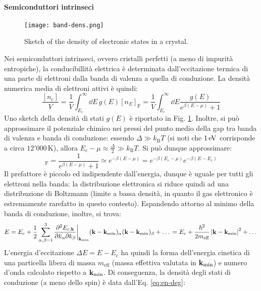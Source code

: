 \paragraph{Semiconduttori intrinseci}

\begin{figure}
	\centering
	\texttt{[image: band-dens.png]}
	\caption{Sketch of the density of electronic states in a crystal.}
	\label{band-dens}
\end{figure}

Nei semiconduttori intrinseci, ovvero cristalli perfetti (a meno di impurità entropiche), la conducibillità elettrica è determinata dall'eccitazione termica di una parte di elettroni dalla banda di valenza a quella di conduzione. La densità numerica media di elettroni attivi è quindi:
\begin{equation*}
	\frac{[n_c]}{V} = \frac{1}{V} \int_{E_c}^\infty \dd E\, g(E) [n_E]_\text{F} = \frac{1}{V} \int_{E_c}^\infty \dd E \frac{g(E)}{e^{\beta (E - \mu)} + 1}
\end{equation*}
Uno sketch della densità di stati $ g(E) $ è riportato in Fig. \ref{band-dens}. Inoltre, si può approssimare il potenziale chimico nei pressi del punto medio della gap tra banda di valenza e banda di conduzione: essendo $ \Delta \gg k_\text{B} T $ (si noti che $ 1\,\mathrm{eV} $ corrisponde a circa $ 12'000 \,\text{K} $), allora $ E_c - \mu \approx \frac{\Delta}{2} \gg k_\text{B} T $. Si può dunque approssimare:
\begin{equation*}
	[n_E]_\text{F} = \frac{1}{e^{\beta (E - \mu)} + 1} \simeq e^{- \beta (E - \mu)} = e^{- \beta (E_c - \mu)} e^{- \beta (E - E_c)}
\end{equation*}
Il prefattore è piccolo ed indipendente dall'energia, dunque è uguale per tutti gli elettroni nella banda: la distribuzione elettronica si riduce quindi ad una distribuzione di Boltzmann (limite a bassa densità, in quanto il gas elettronico è estremamente rarefatto in questo contesto). Espandendo attorno al minimo della banda di conduzione, inoltre, si trova:
\begin{equation*}
	E = E_c + \frac{1}{2} \sum_{\alpha,\beta = 1}^3 \frac{\partial^2 E_{c,\mathbf{k}}}{\partial k_\alpha \partial k_\beta}\bigg\vert_{\mathbf{k}_\text{min}} (\mathbf{k} - \mathbf{k}_\text{min})_\alpha (\mathbf{k} - \mathbf{k}_\text{min})_\beta + \dots \,= E_c + \frac{\hbar^2}{2m_\text{eff}} \left\lvert\mathbf{k} - \mathbf{k}_\text{min}\right\rvert^2 + \dots
\end{equation*}
L'energia d'eccitazione $ \Delta E = E - E_c $ ha quindi la forma dell'energia cinetica di una particella libera di massa $ m_\text{eff} $ (massa effettiva valutata in $ \mathbf{k}_\text{min} $) e numero d'onda calcolato rispetto a $ \mathbf{k}_\text{min} $. Di conseguenza, la densità degli stati di conduzione (a meno dello spin) è data dall'Eq. \ref{eq:en-deg}:
